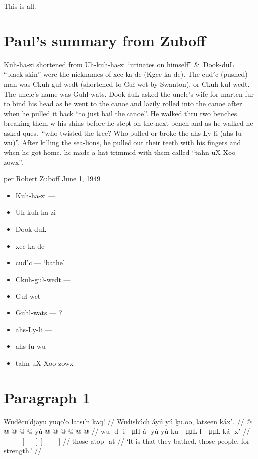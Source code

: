 This is all.

\section{Paul’s summary from Zuboff}\label{sec:093-paul-summary}

Kuh-ha-zi shortened from Uh-kuh-ha-zi “urinates on himself” \&\ Dook-duL “black-skin” were the nicknames of xec-ka-de (Kgec-ka-de).
The cudʼc (pushed) man was Ckuh-guł-wedt (shortened to Guł-wet by Swanton), or Ckuh-kuł-wedt.
The uncle’s name was Guhl-wats.
Dook-duL asked the uncle’s wife for marten fur to bind his head as he went to the canoe and lazily rolled into the canoe after when he pulled it back “to just bail the canoe”.
He walked thru two benches breaking them w his shins before he stept on the next bench and as he walked he asked ques.\ “who twisted the tree?
Who pulled or broke the ahs-Ly-łi (ahs-łu-wu)”.
After killing the sea-lions, he pulled out their teeth with his fingers and when he got home, he made a hat trimmed with them called “tahn-uX-Xoo-zowx”.

per Robert Zuboff June 1, 1949

\begin{itemize}
\item	Kuh-ha-zi — 
\item	Uh-kuh-ha-zi — 
\item	Dook-duL — 
\item	xec-ka-de — 
\item	cudʼc —  ‘bathe’
\item	Ckuh-guł-wedt — 
\item	Guł-wet — 
\item	Guhl-wats — ?
\item	ahs-Ly-łi — 
\item	ahs-łu-wu — 
\item	tahn-uX-Xoo-zowx — 
\end{itemize}

\section{Paragraph 1}\label{sec:093-para-1}

\ex\label{ex:93-1-bathe-for-strength}%
%
\begingl
	\glpreamble	Wudêcu′djayu yuqo′ō łatsī′n kᴀq! //
	\glpreamble	Wudishúch áyú yú ḵu.oo, latseen káxʼ. //
	\gla	{} @ {} @ {} @ {} @ {}  @ {}
		{} yú  @ {} @ {} {}
		{}  @ {} @ {} @ {}  @ {} {} //
	\glb	wu- d- i-  -μH á -yú
		{} yú ḵu-  -μμL {}
		{} l-  -μμL {} ká -xʼ {} //
	\glc	{}- - -  -  -
		{}[  -  - {}]
		{}[ -  - \·  - {}] //
	\gld	{} {} {} {} {}  {}
		{} those  {} {} {}
		{}  {} {} {} atop -at {} //
	\glft	‘It is that they bathed, those people, for strength.’
		//
\endgl
\xe

